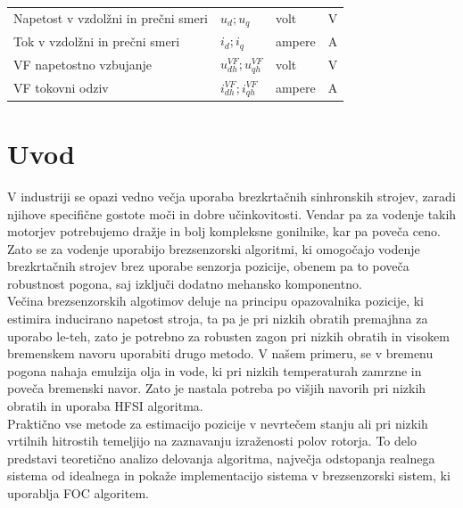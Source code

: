 \documentclass[a4paper,twoside,openright,12pt,slovene]{book}
\begin{document}
\begin{center}
\begin{tabular}{*{4}{l}}
        Napetost v vzdolžni in prečni smeri                        & $u_{d}; u_{q}$                         & volt                 & V                      \\
        Tok v vzdolžni in prečni smeri                             & $i_{d}; i_{q}$                         & ampere               & A                      \\
        VF napetostno vzbujanje                                    & $u^{VF}_{dh}; u^{VF}_{qh}$             & volt                 & V                      \\
        VF tokovni odziv                                           & $i^{VF}_{dh}; i^{VF}_{qh}$             & ampere               & A                      \\
    \end{tabular}
\end{center}

\mainmatter

\chapter{Uvod} \label{uvod}

V industriji se opazi vedno večja uporaba brezkrtačnih sinhronskih strojev, zaradi njihove specifične gostote moči in dobre učinkovitosti. Vendar pa za vodenje takih motorjev potrebujemo dražje in
bolj kompleksne gonilnike, kar pa poveča ceno. Zato se za vodenje uporabijo brezsenzorski algoritmi, ki omogočajo vodenje brezkrtačnih strojev brez uporabe senzorja pozicije, obenem pa to poveča
robustnost pogona, saj izključi dodatno mehansko komponentno. 
\\
Večina brezsenzorskih algotimov deluje na principu opazovalnika pozicije, ki estimira inducirano napetost stroja, ta pa je pri nizkih obratih premajhna za uporabo le-teh, zato je potrebno za robusten
zagon pri nizkih obratih in visokem bremenskem navoru uporabiti drugo metodo. V našem primeru, se v bremenu pogona nahaja emulzija olja in vode, ki pri nizkih temperaturah zamrzne in poveča bremenski
navor. Zato je nastala potreba po višjih navorih pri nizkih obratih in uporaba HFSI algoritma. 
\\
Praktično vse metode za estimacijo pozicije v nevrtečem stanju ali pri nizkih vrtilnih hitrostih temeljijo na zaznavanju izraženosti polov rotorja. To delo predstavi teoretično analizo delovanja
algoritma, največja odstopanja realnega sistema od idealnega in pokaže implementacijo sistema v brezsenzorski sistem, ki uporablja FOC algoritem.
\end{document}
